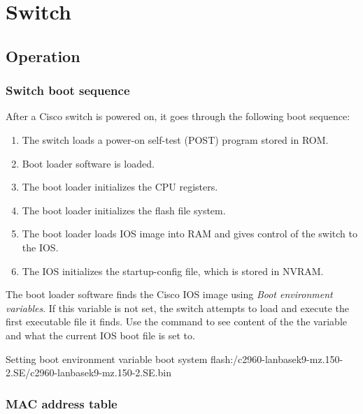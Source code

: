 \chapter{Switch}

\section{Operation}

\subsection{Switch boot sequence}

After a Cisco switch is powered on, it goes through the following boot sequence:

\begin{enumerate}
\item The switch loads a power-on self-test (POST) program stored in ROM.

\item Boot loader software is loaded.

\item The boot loader initializes the CPU registers.

\item The boot loader initializes the flash file system.

\item The boot loader loads IOS image into RAM and gives control of the switch to the IOS.

\item The IOS initializes the startup-config file, which is stored in NVRAM.
\end{enumerate}

The boot loader software finds the Cisco IOS image using \emph{Boot environment variables}. If this variable is not set, the switch attempts to load and execute the first executable file it finds. Use the command  to see content of the the variable and what the current IOS boot file is set to.

\begin{sexylisting}{Setting boot environment variable}
boot system flash:/c2960-lanbasek9-mz.150-2.SE/c2960-lanbasek9-mz.150-2.SE.bin
\end{sexylisting}

\subsection{MAC address table}

